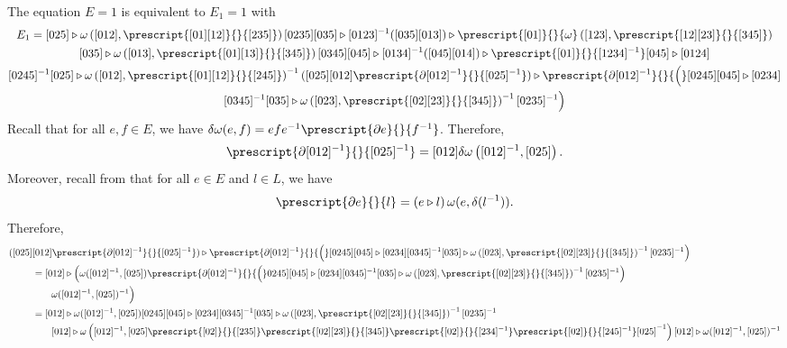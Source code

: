 \documentclass[a4paper, oneside]{amsart}
\numberwithin{equation}{subsection}
\theoremstyle{referencedlemma}
\theoremstyle{plain} %
\theoremstyle{remark}
\begin{document}
The equation $E = 1$ is equivalent to $E_1 = 1$ with 
\begin{multline*}
E_1 = [025]\triangleright \omega\left([012], \prescript{[01][12]}{}{[235]} \right) [0235] [035]\triangleright [0123]^{-1} ([035][013]) \triangleright \prescript{[01]}{}{\omega} \left([123], \prescript{[12][23]}{}{[345]} \right)\\
[035]\triangleright \omega\left([013], \prescript{[01][13]}{}{[345]} \right)[0345][045]\triangleright [0134]^{-1} ([045][014])\triangleright \prescript{[01]}{}{[1234]^{-1}} [045]\triangleright [0124]\\
 [0245]^{-1}[025]\triangleright \omega\left([012], \prescript{[01][12]}{}{[245]} \right)^{-1} ([025][012]\prescript{\partial [012]^{-1}}{}{[025]^{-1}}) \triangleright \prescript{\partial [012]^{-1}}{}{\Big (}[0245] [045]\triangleright [0234]\\
 [0345]^{-1}[035] \triangleright \omega\left([023], \prescript{[02][23]}{}{[345]} \right)^{-1} [0235]^{-1}\Big )
\end{multline*}
Recall that for all $e,f \in E$, we have $\delta \omega(e,f) = efe^{-1}\prescript{\partial e}{}{f^{-1}}$.  Therefore, 
\begin{equation*}
[025][012]\prescript{\partial [012]^{-1}}{}{[025]^{-1}} = [012] \delta \omega\left( [012]^{-1}, [025]\right).
\end{equation*}
Moreover, recall from \cite[Lemma 2.2]{martins_fundamental_2011} that for all $e\in E$ and $l\in L$, we have
\begin{equation*}
\prescript{\partial e}{}{l} = \left(e\triangleright l\right) \omega(e, \delta( l^{-1})). 
\end{equation*}
Therefore,
\begin{align*}
([025]&[012]\prescript{\partial [012]^{-1}}{}{[025]^{-1}}) \triangleright \prescript{\partial [012]^{-1}}{}{\Big (}[0245] [045]\triangleright [0234]
 [0345]^{-1}[035] \triangleright \omega\left([023], \prescript{[02][23]}{}{[345]} \right)^{-1} [0235]^{-1}\Big )\\ 
&= [012]\triangleright \Big ( \omega ([012]^{-1}, [025]) \prescript{\partial [012]^{-1}}{}{\Big (}0245] [045]\triangleright [0234]
 [0345]^{-1}[035] \triangleright \omega\left([023], \prescript{[02][23]}{}{[345]} \right)^{-1} [0235]^{-1}\Big )\\
 & \quad \quad \omega ([012]^{-1}, [025])^{-1}\Big )\\
 &= [012] \triangleright \omega ([012]^{-1}, [025]) [0245][045]\triangleright [0234][0345]^{-1}[035] \triangleright \omega\left([023], \prescript{[02][23]}{}{[345]} \right)^{-1} [0235]^{-1}\\
 & \quad \quad [012]\triangleright \omega \left([012]^{-1}, [025]\prescript{[02]}{}{[235]}\prescript{[02][23]}{}{[345]}\prescript{[02]}{}{[234]^{-1}}\prescript{[02]}{}{[245]^{-1}} [025]^{-1} \right) [012]\triangleright \omega ([012]^{-1}, [025])^{-1}
\end{align*}
\end{document}
